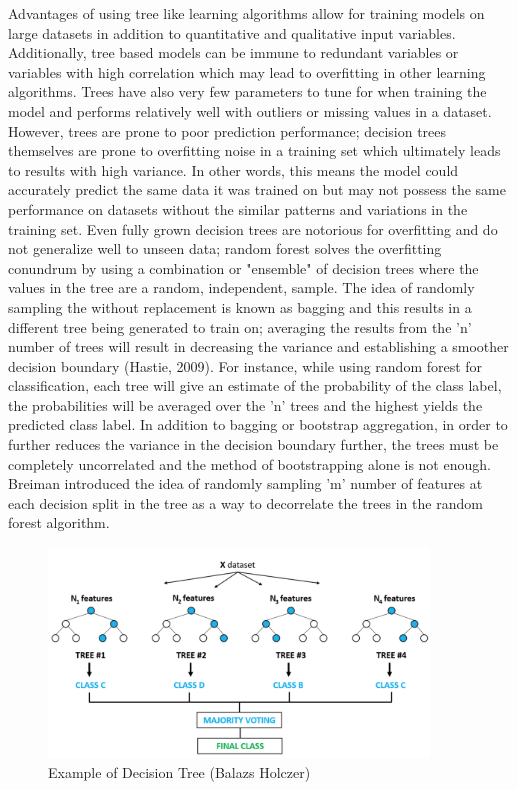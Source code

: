 \documentclass{llncs}
\begin{document}
Advantages of using tree like learning algorithms allow for training models on large datasets in addition to quantitative and qualitative input variables. Additionally, tree based models can be immune to redundant variables or variables with high correlation which may lead to overfitting in other learning algorithms. Trees have also very few parameters to tune for when training the model and performs relatively well with outliers or missing values in a dataset. However, trees are prone to poor prediction performance; decision trees themselves are prone to overfitting noise in a training set which ultimately leads to results with high variance. In other words, this means the model could accurately predict the same data it was trained on but may not possess the same performance on datasets without the similar patterns and variations in the training set. Even fully grown decision trees are notorious for overfitting and do not generalize well to unseen data; random forest solves the overfitting conundrum by using a combination or "ensemble" of decision trees where the values in the tree are a random, independent, sample. The idea of randomly sampling the without replacement is known as bagging and this results in a different tree being generated to train on; averaging the results from the 'n' number of trees will result in decreasing the variance and establishing a smoother decision boundary (Hastie,  2009). For instance, while using random forest for classification, each tree will give an estimate of the probability of the class label, the probabilities will be averaged over the 'n' trees and the highest yields the predicted class label. In addition to bagging or bootstrap aggregation, in order to further reduces the variance in the decision boundary further, the trees must be completely uncorrelated and the method of bootstrapping alone is not enough. Breiman introduced the idea of randomly sampling 'm' number of features at each decision split in the tree as a way to decorrelate the trees in the random forest algorithm.  


\begin{figure}
\centering
\includegraphics[width=0.90\textwidth]{randomforest.png}
\caption{Example of Decision Tree (Balazs Holczer)}
\end{figure}
\end{document}
